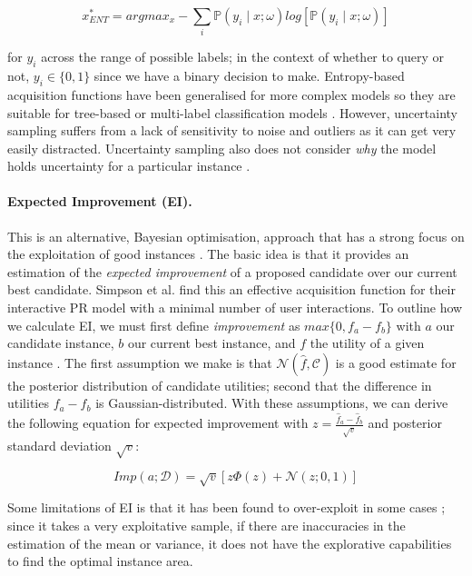 \documentclass[ %
                    author={James Stephenson},
                supervisor={Dr. Edwin Simpson},
                    degree={MSc},
                     title={PROJECT PLAN},
                  subtitle={Bayesian Deep Learning For Extractive Test Summarisation},
                      type={},
                      year={2022}]{../additions/dissertation}
\begin{document}
				$$
					x^{\ast}_{ENT} = argmax_{x} - \sum_i \mathbb{P}(y_i \mid x; \omega) log \left[ \mathbb{P}(y_i \mid x; \omega) \right]
				$$
	
				\noindent
				for $y_i$ across the range of possible labels; in the context of whether to query or not, $y_i \in \{0,1\}$ since we have a binary decision to make. Entropy-based acquisition functions have been generalised for more complex models so they are suitable for tree-based or multi-label classification models \cite{Craven08, Hwa04}. However, uncertainty sampling suffers from a lack of sensitivity to noise and outliers as it can get very easily distracted. Uncertainty sampling also does not consider \emph{why} the model holds uncertainty for a particular instance \cite{Sharma17}.

				\paragraph{Expected Improvement (EI).} This is an alternative, Bayesian optimisation, approach that has a strong focus on the exploitation of good instances \cite{Mockus75}. The basic idea is that it provides an estimation of the \emph{expected improvement} of a proposed candidate over our current best candidate. Simpson et al. \cite{Simpson19} find this an effective acquisition function for their interactive PR model with a minimal number of user interactions. To outline how we calculate EI, we must first define \emph{improvement} as $max\{0, f_a - f_b\}$ with $a$ our candidate instance, $b$ our current best instance, and $f$ the utility of a given instance \cite{Simpson19}. The first assumption we make is that $\mathcal{N}(\hat{f}, \mathcal{C})$ is a good estimate for the posterior distribution of candidate utilities; second that the difference in utilities $f_a - f_b$ is Gaussian-distributed. With these assumptions, we can derive the following equation for expected improvement with $z = \frac{\hat{f}_a - \hat{f}_b}{\sqrt{v}}$ and posterior standard deviation $\sqrt{v}$:

				$$
					Imp(a; \mathcal{D}) = \sqrt{v}\left[z \Phi(z) + \mathcal{N}(z; 0, 1)\right]
				$$	

				\noindent
				Some limitations of EI is that it has been found to over-exploit in some cases \cite{Qin17}; since it takes a very exploitative sample, if there are inaccuracies in the estimation of the mean or variance, it does not have the explorative capabilities to find the optimal instance area.
\end{document}
